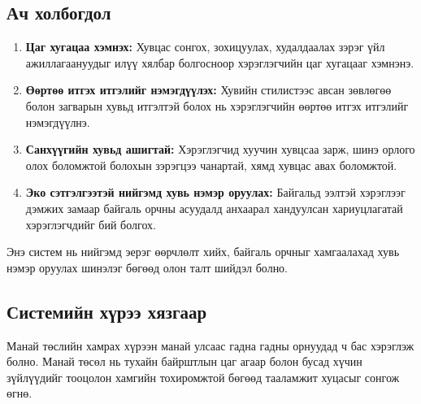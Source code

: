 \subsection*{Ач холбогдол}
\begin{enumerate}
   \item \textbf{Цаг хугацаа хэмнэх:} Хувцас сонгох, зохицуулах, худалдаалах зэрэг үйл ажиллагаануудыг илүү хялбар болгосноор хэрэглэгчийн цаг хугацааг хэмнэнэ.
   \item \textbf{Өөртөө итгэх итгэлийг нэмэгдүүлэх:} Хувийн стилистээс авсан зөвлөгөө болон загварын хувьд итгэлтэй болох нь хэрэглэгчийн өөртөө итгэх итгэлийг нэмэгдүүлнэ.
   \item \textbf{Санхүүгийн хувьд ашигтай:} Хэрэглэгчид хуучин хувцсаа зарж, шинэ орлого олох боломжтой болохын зэрэгцээ чанартай, хямд хувцас авах боломжтой.
   \item \textbf{Эко сэтгэлгээтэй нийгэмд хувь нэмэр оруулах:} Байгальд ээлтэй хэрэглээг дэмжих замаар байгаль орчны асуудалд анхаарал хандуулсан хариуцлагатай хэрэглэгчдийг бий болгох.
\end{enumerate}
Энэ систем нь нийгэмд эерэг өөрчлөлт хийх, байгаль орчныг хамгаалахад хувь нэмэр оруулах шинэлэг бөгөөд олон талт шийдэл болно.

\subsection*{Системийн хүрээ хязгаар}
Манай төслийн хамрах хүрээн манай улсаас гадна гадны орнуудад ч бас хэрэглэж болно. Манай төсөл нь тухайн байрштлын цаг агаар болон бусад хүчин зүйлүүдийг тооцолон хамгийн тохиромжтой бөгөөд тааламжит хуцасыг сонгож өгнө.


